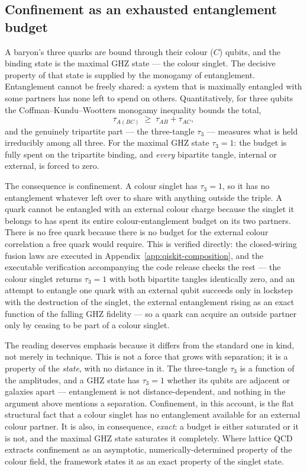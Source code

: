 \subsection{Confinement as an exhausted entanglement budget}

A baryon's three quarks are bound through their colour ($C$) qubits, and the binding state is the
maximal GHZ state --- the colour singlet. The decisive property of that state is supplied by the
monogamy of entanglement. Entanglement cannot be freely shared: a system that is maximally entangled
with some partners has none left to spend on others. Quantitatively, for three qubits the
Coffman--Kundu--Wootters monogamy inequality
\autocite{coffmankunduwootters2000,osborneverstraete2006} bounds the total,
\begin{equation}
  \tau_{A(BC)} \;\ge\; \tau_{AB} + \tau_{AC},
\end{equation}
and the genuinely tripartite part --- the three-tangle $\tau_3$ --- measures what is held
irreducibly among all three. For the maximal GHZ state $\tau_3 = 1$: the budget is fully spent on
the tripartite binding, and \emph{every} bipartite tangle, internal or external, is forced to zero.

The consequence is confinement. A colour singlet has $\tau_3 = 1$, so it has no entanglement
whatever left over to share with anything outside the triple. A quark cannot be entangled with an
external colour charge because the singlet it belongs to has spent its entire colour-entanglement
budget on its two partners. There is no free quark because there is no budget for the external
colour correlation a free quark would require. This is verified directly: the closed-wiring
fusion laws are executed in Appendix~\ref{app:qiskit-composition}, and the executable verification
accompanying the code release checks the rest --- the colour singlet returns $\tau_3 = 1$ with both
bipartite tangles identically zero, and an attempt to entangle one quark with an external qubit
succeeds only in lockstep with the destruction of the singlet, the external entanglement rising as
an exact function of the falling GHZ fidelity --- so a quark can acquire an outside partner only by
ceasing to be part of a colour singlet.

The reading deserves emphasis because it differs from the standard one in kind, not merely in
technique. This is not a force that grows with separation; it is a property of the \emph{state},
with no distance in it. The three-tangle $\tau_3$ is a function of the amplitudes, and a GHZ state
has $\tau_3 = 1$ whether its qubits are adjacent or galaxies apart --- entanglement is not
distance-dependent, and nothing in the argument above mentions a separation. Confinement, in this
account, is the flat structural fact that a colour singlet has no entanglement available for an
external colour partner. It is also, in consequence, \emph{exact}: a budget is either saturated or
it is not, and the maximal GHZ state saturates it completely. Where lattice QCD extracts confinement
as an asymptotic, numerically-determined property of the colour field, the framework states it as an
exact property of the singlet state.

